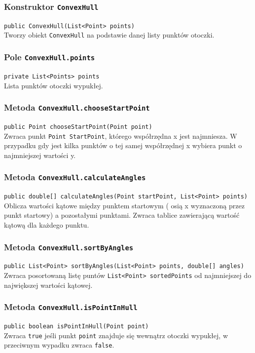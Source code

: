 \documentclass{article}
\begin{document}
\subsubsection{Konstruktor \texttt{ConvexHull}}
\texttt{public ConvexHull(List<Point> points)} \\
Tworzy obiekt \texttt{ConvexHull} na podstawie danej listy punktów otoczki.

\subsubsection{Pole \texttt{ConvexHull.points}}
\texttt{private List<Points> points} \\
Lista punktów otoczki wypukłej.

\subsubsection{Metoda \texttt{ConvexHull.chooseStartPoint}}
\texttt{public Point chooseStartPoint(Point point)} \\
Zwraca punkt \texttt{Point StartPoint}, którego współrzędna x jest najmniesza. W przypadku gdy jest kilka punktów o tej samej współrzędnej x wybiera punkt o najmniejszej wartości y.


\subsubsection{Metoda \texttt{ConvexHull.calculateAngles}}
\texttt{public double[] calculateAngles(Point startPoint, List<Point> points)} \\
Oblicza wartości kątowe między punktem startowym ( osią x wyznaczoną przez punkt startowy) a pozostałymi punktami. Zwraca tablice zawierającą wartość kątową dla każdego punktu.

\subsubsection{Metoda \texttt{ConvexHull.sortByAngles}}
\texttt{public List<Point> sortByAngles(List<Point> points, double[] angles)} \\
Zwraca posortowaną listę puntów \texttt{List<Point> sortedPoints} od najmniejszej do największej wartości kątowej.

\subsubsection{Metoda \texttt{ConvexHull.isPointInHull}}
\texttt{public boolean isPointInHull(Point point)} \\
Zwraca \texttt{true} jeśli punkt \texttt{point} znajduje się wewnątrz otoczki wypukłej, w przeciwnym wypadku zwraca \texttt{false}.
\end{document}
